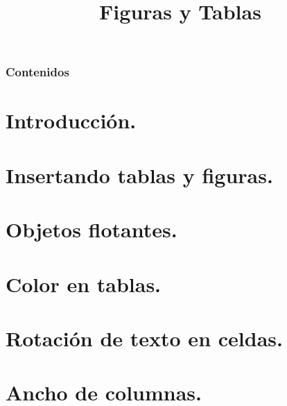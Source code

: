 \documentclass[11pt]{beamer}
\theoremstyle{plain} %
\theoremstyle{definition}
\begin{document}
	\title{Figuras y Tablas}
	\begin{frame}[plain]
		\maketitle
	\end{frame}

    \begin{frame}
    	\frametitle{Contenidos}
    	\tableofcontents[pausesections]
    \end{frame}
    \section[Introducción]{Introducción.}
    \section[Insertando tablas y figuras]{Insertando tablas y figuras.}
    \section[Objetos flotantes]{Objetos flotantes.}
    \section[Color en tablas]{Color en tablas.}
    \section[Rotación de texto en celdas]{Rotación de texto en celdas.}
    \section[Ancho de columnas]{Ancho de columnas.}
\end{document}
